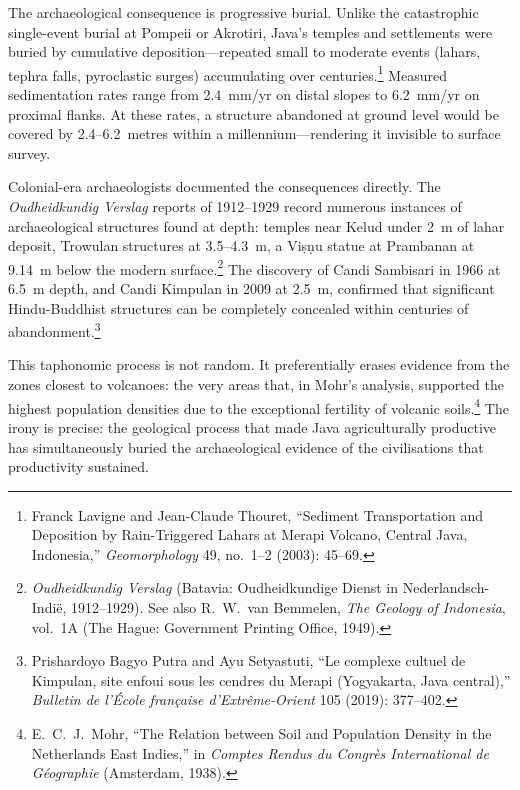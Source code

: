 \documentclass[12pt,a4paper]{article}
\begin{document}
The archaeological consequence is progressive burial.
Unlike the catastrophic single-event burial at Pompeii or Akrotiri, Java's temples and settlements were buried by cumulative deposition---repeated small to moderate events (lahars, tephra falls, pyroclastic surges) accumulating over centuries.\footnote{Franck Lavigne and Jean-Claude Thouret, ``Sediment Transportation and Deposition by Rain-Triggered Lahars at Merapi Volcano, Central Java, Indonesia,'' \emph{Geomorphology} 49, no.~1--2 (2003): 45--69.}
Measured sedimentation rates range from 2.4~mm/yr on distal slopes to 6.2~mm/yr on proximal flanks.
At these rates, a structure abandoned at ground level would be covered by 2.4--6.2~metres within a millennium---rendering it invisible to surface survey.

Colonial-era archaeologists documented the consequences directly.
The \emph{Oudheidkundig Verslag} reports of 1912--1929 record numerous instances of archaeological structures found at depth: temples near Kelud under 2~m of lahar deposit, Trowulan structures at 3.5--4.3~m, a Vi\d{s}\d{n}u statue at Prambanan at 9.14~m below the modern surface.\footnote{\emph{Oudheidkundig Verslag} (Batavia: Oudheidkundige Dienst in Nederlandsch-Indi\"{e}, 1912--1929). See also R.~W.\ van Bemmelen, \emph{The Geology of Indonesia}, vol.~1A (The Hague: Government Printing Office, 1949).}
The discovery of Candi Sambisari in 1966 at 6.5~m depth, and Candi Kimpulan in 2009 at 2.5~m, confirmed that significant Hindu-Buddhist structures can be completely concealed within centuries of abandonment.\footnote{Prishardoyo Bagyo Putra and Ayu Setyastuti, ``Le complexe cultuel de Kimpulan, site enfoui sous les cendres du Merapi (Yogyakarta, Java central),'' \emph{Bulletin de l'\'{E}cole fran\c{c}aise d'Extr\^{e}me-Orient} 105 (2019): 377--402.}

This taphonomic process is not random.
It preferentially erases evidence from the zones closest to volcanoes: the very areas that, in Mohr's analysis, supported the highest population densities due to the exceptional fertility of volcanic soils.\footnote{E.~C.~J.\ Mohr, ``The Relation between Soil and Population Density in the Netherlands East Indies,'' in \emph{Comptes Rendus du Congr\`{e}s International de G\'{e}ographie} (Amsterdam, 1938).}
The irony is precise: the geological process that made Java agriculturally productive has simultaneously buried the archaeological evidence of the civilisations that productivity sustained.


\end{document}
